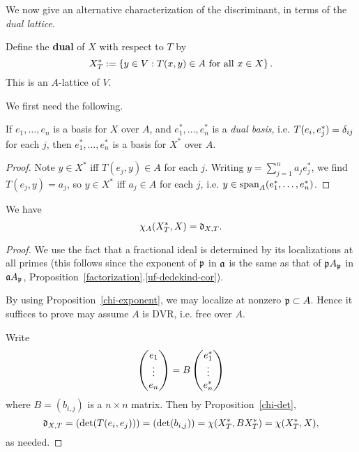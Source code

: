 We now give an alternative characterization of the discriminant, in terms of the {\it dual lattice}.
\begin{df}
Define the \textbf{dual} of $X$ with respect to $T$ by
\[
X_T^*:=\left\{{y\in V}:{T(x,y)\in A\text{ for all }x\in X}\right\}.
\]
This is an $A$-lattice of $V$.
\end{df}
We first need the following.
\begin{pr}
If $e_1,\ldots, e_n$ is a basis for $X$ over $A$, and $e_1^*,\ldots, e_n^*$ is a {\it dual basis}, i.e. $T(e_i,e_j^*)=\delta_{ij}$ for each $j$, then $e_1^*,\ldots, e_n^*$ is a basis for $X^*$ over $A$.
\end{pr}
\begin{proof}
Note $y\in X^*$ iff $T(e_j,y)\in A$ for each $j$. Writing $y=\sum_{j=1}^n a_je_j^*$, we find $T(e_j,y)=a_j$, so $y\in X^*$ iff $a_j\in A$ for each $j$, i.e. $y\in \operatorname{span}_A(e_1^*,\ldots ,e_n^*)$.
\end{proof}
\begin{pr}
We have
\[
\chi_A(X_T^*,X)=\mathfrak d_{X,T}.
\]
\end{pr}
\begin{proof}
We use the fact that a fractional ideal is determined by its localizations at all primes (this follows since the exponent of $\mathfrak{p}$ in $\mathfrak{a}$ is the same as that of $\mathfrak{p} A_{\mathfrak{p}}$ in $\mathfrak{a} A_{\mathfrak{p}}$, Proposition~\ref{factorization}.\ref{uf-dedekind-cor}).

By using Proposition~\ref{chi-exponent}, we may localize at nonzero $\mathfrak{p}\subset A$. Hence it suffices to prove may assume $A$ is DVR, i.e. free over $A$.

Write
\[
\begin{pmatrix} {e_1}\\ {\vdots}\\ {e_n} \end{pmatrix}
=
B
\begin{pmatrix} {e_1^*}\\ {\vdots}\\ {e_n^*} \end{pmatrix}
\]
where $B=(b_{i,j})$ is a $n\times n$ matrix.
Then by Proposition~\ref{chi-det},
\[
\mathfrak d_{X,T}=(\det(T(e_i,e_j)))=(\det(b_{i,j}))=\chi(X_T^*, BX_T^*)=\chi(X_T^*,X),
\]
as needed.
\end{proof}
